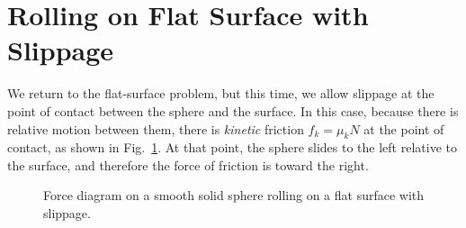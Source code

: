 \documentclass[11pt]{article}
\newcommand{\mb}[1]{\mathbf{#1}}
\begin{document}
\section{Rolling on Flat Surface with Slippage}

We return to the flat-surface problem, but this time, we allow slippage at the
point of contact between the sphere and the surface. In this case, because there
is relative motion between them, there is \emph{kinetic} friction $f_k=\mu_kN$
at the point of contact, as shown in Fig.~\ref{slip1}. At that point, the sphere
slides to the left relative to the surface, and therefore the force of friction
is toward the right.
\begin{figure}[!ht]
  \centering
  \caption{Force diagram on a smooth solid sphere rolling on a flat surface with
    slippage.}
  \label{slip1}
\end{figure}
\end{document}
